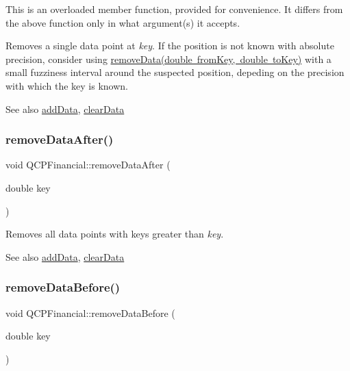 This is an overloaded member function, provided for convenience. It differs from the above function only in what argument(s) it accepts.

Removes a single data point at {\itshape key}. If the position is not known with absolute precision, consider using \mbox{\hyperlink{class_q_c_p_financial_a048c741d3c8cc5709c2c44b759fdf27c}{remove\+Data(double from\+Key, double to\+Key)}} with a small fuzziness interval around the suspected position, depeding on the precision with which the key is known.

\begin{DoxySeeAlso}{See also}
\mbox{\hyperlink{class_q_c_p_financial_a1a83396f97fcc68f2b7aa8d9782feffe}{add\+Data}}, \mbox{\hyperlink{class_q_c_p_financial_a11fd49928c33e55e27b7319c6927864a}{clear\+Data}} 
\end{DoxySeeAlso}
\mbox{\label{class_q_c_p_financial_aa0fcd357005288c833a230c7874825ba}} 
\subsubsection{\texorpdfstring{remove\+Data\+After()}{removeDataAfter()}}
{\footnotesize\ttfamily void Q\+C\+P\+Financial\+::remove\+Data\+After (\begin{DoxyParamCaption}\item[{double}]{key }\end{DoxyParamCaption})}

Removes all data points with keys greater than {\itshape key}.

\begin{DoxySeeAlso}{See also}
\mbox{\hyperlink{class_q_c_p_financial_a1a83396f97fcc68f2b7aa8d9782feffe}{add\+Data}}, \mbox{\hyperlink{class_q_c_p_financial_a11fd49928c33e55e27b7319c6927864a}{clear\+Data}} 
\end{DoxySeeAlso}
\mbox{\label{class_q_c_p_financial_a097c0383c7c1e9042ca7f93cb439d15a}} 
\subsubsection{\texorpdfstring{remove\+Data\+Before()}{removeDataBefore()}}
{\footnotesize\ttfamily void Q\+C\+P\+Financial\+::remove\+Data\+Before (\begin{DoxyParamCaption}\item[{double}]{key }\end{DoxyParamCaption})}

